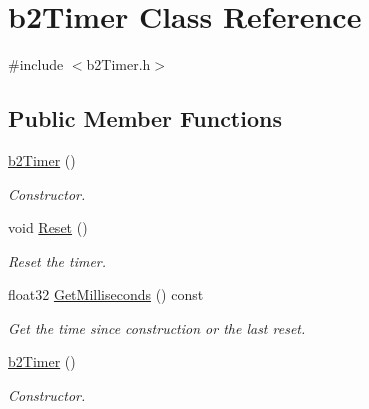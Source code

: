 \hypertarget{classb2Timer}{}\section{b2\+Timer Class Reference}
\label{classb2Timer}


{\ttfamily \#include $<$b2\+Timer.\+h$>$}

\subsection*{Public Member Functions}
\begin{DoxyCompactItemize}
\item 
\mbox{\label{classb2Timer_afcc159032a8edeaa9febdf2b6cbd49a5}} 
\hyperlink{classb2Timer_afcc159032a8edeaa9febdf2b6cbd49a5}{b2\+Timer} ()
\begin{DoxyCompactList}\small\item\em Constructor. \end{DoxyCompactList}\item 
\mbox{\label{classb2Timer_a367388794588e9283600437be82f2889}} 
void \hyperlink{classb2Timer_a367388794588e9283600437be82f2889}{Reset} ()
\begin{DoxyCompactList}\small\item\em Reset the timer. \end{DoxyCompactList}\item 
\mbox{\label{classb2Timer_a15fd1aaa83a9d58cc004c852df71abb3}} 
float32 \hyperlink{classb2Timer_a15fd1aaa83a9d58cc004c852df71abb3}{Get\+Milliseconds} () const
\begin{DoxyCompactList}\small\item\em Get the time since construction or the last reset. \end{DoxyCompactList}\item 
\mbox{\label{classb2Timer_afcc159032a8edeaa9febdf2b6cbd49a5}} 
\hyperlink{classb2Timer_afcc159032a8edeaa9febdf2b6cbd49a5}{b2\+Timer} ()
\begin{DoxyCompactList}\small\item\em Constructor. \end{DoxyCompactList}\item 
\mbox{\label{classb2Timer_a367388794588e9283600437be82f2889}} 

\end{DoxyCompactItemize}

